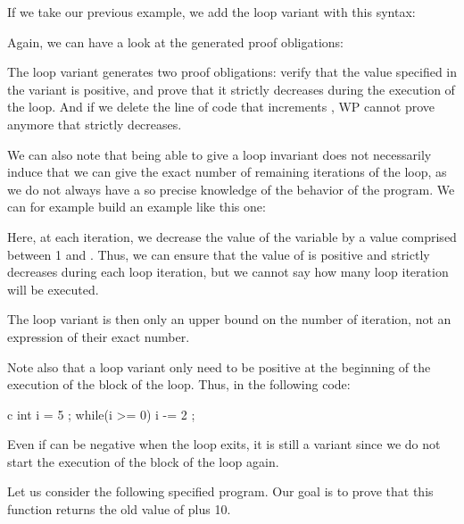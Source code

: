 If we take our previous example, we add the loop variant with this
syntax:






Again, we can have a look at the generated proof obligations:





The loop variant generates two proof obligations: verify that the value
specified in the variant is positive, and prove that it strictly
decreases during the execution of the loop. And if we delete the line of
code that increments , WP cannot prove anymore that
 strictly decreases.

We can also note that being able to give a loop invariant does not
necessarily induce that we can give the exact number of remaining
iterations of the loop, as we do not always have a so precise knowledge
of the behavior of the program. We can for example build an example like
this one:






Here, at each iteration, we decrease the value of the variable
 by a value comprised between 1 and . Thus, we can
ensure that the value of  is positive and strictly decreases
during each loop iteration, but we cannot say how many loop iteration
will be executed.



The loop variant is then only an upper bound on the number of iteration,
not an expression of their exact number.


Note also that a loop variant only need to be positive at the beginning
of the execution of the block of the loop. Thus, in the following code:


\begin{CodeBlock}{c}
int i = 5 ;
while(i >= 0){
  i -= 2 ;
}
\end{CodeBlock}

Even if  can be negative when the loop exits, it is still
a variant since we do not start the execution of the block of the loop
again.




Let us consider the following specified program. Our goal is to prove
that this function returns the old value of  plus 10.



